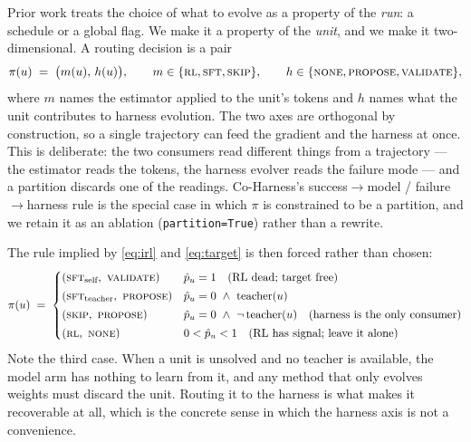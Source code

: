 Prior work treats the choice of what to evolve as a property of the \emph{run}: a schedule
or a global flag. We make it a property of the \emph{unit}, and we make it two-dimensional.
A routing decision is a pair
%
\begin{equation}
  \pi(u) \;=\; \bigl(m(u),\, h(u)\bigr),
  \qquad
  m \in \{\textsc{rl}, \textsc{sft}, \textsc{skip}\},
  \qquad
  h \in \{\textsc{none}, \textsc{propose}, \textsc{validate}\},
  \label{eq:action}
\end{equation}
%
where $m$ names the estimator applied to the unit's tokens and $h$ names what the unit
contributes to harness evolution. The two axes are orthogonal by construction, so a single
trajectory can feed the gradient and the harness at once. This is deliberate: the two
consumers read different things from a trajectory --- the estimator reads the tokens, the
harness evolver reads the failure mode --- and a partition discards one of the readings.
Co-Harness's success$\to$model / failure$\to$harness rule is the special case in which
$\pi$ is constrained to be a partition, and we retain it as an ablation
(\texttt{partition=True}) rather than a rewrite.

The rule implied by \eqref{eq:irl} and \eqref{eq:target} is then forced rather than chosen:
%
\begin{equation}
  \pi(u) \;=\;
  \begin{cases}
    (\textsc{sft}_{\text{self}},\ \textsc{validate})
      & \hat p_u = 1 \quad\text{(RL dead; target free)}\\[2pt]
    (\textsc{sft}_{\text{teacher}},\ \textsc{propose})
      & \hat p_u = 0 \ \wedge\ \mathrm{teacher}(u) \\[2pt]
    (\textsc{skip},\ \textsc{propose})
      & \hat p_u = 0 \ \wedge\ \neg\,\mathrm{teacher}(u)
      \quad\text{(harness is the only consumer)}\\[2pt]
    (\textsc{rl},\ \textsc{none})
      & 0 < \hat p_u < 1 \quad\text{(RL has signal; leave it alone)}
  \end{cases}
  \label{eq:rule}
\end{equation}
%
Note the third case. When a unit is unsolved and no teacher is available, the model arm has
nothing to learn from it, and any method that only evolves weights must discard the unit.
Routing it to the harness is what makes it recoverable at all, which is the concrete sense
in which the harness axis is not a convenience.

